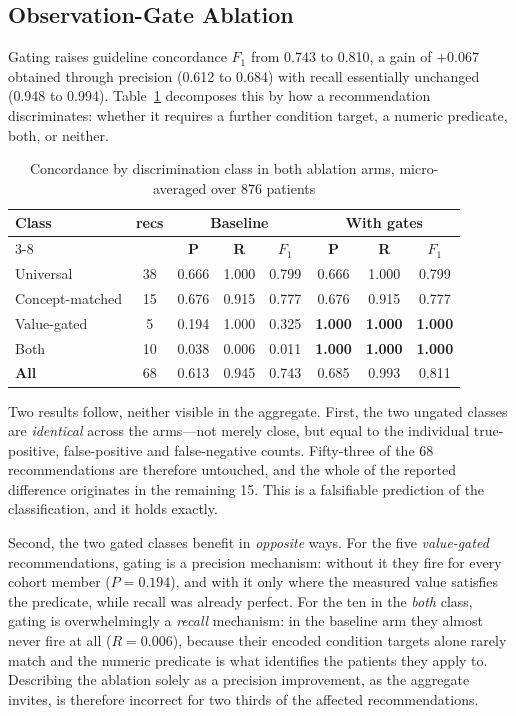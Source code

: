 \documentclass[conference]{IEEEtran}
\begin{document}
\subsection{Observation-Gate Ablation}
Gating raises guideline concordance $F_1$ from 0.743 to 0.810, a gain of $+0.067$ obtained
through precision (0.612 to 0.684) with recall essentially unchanged (0.948 to 0.994).
Table~\ref{tab:ablation} decomposes this by how a recommendation discriminates: whether it
requires a further condition target, a numeric predicate, both, or neither.

\begin{table}[htbp]
\caption{Concordance by discrimination class in both ablation arms, micro-averaged over
876 patients}
\label{tab:ablation}
\begin{center}
\setlength{\tabcolsep}{3.5pt}
\begin{tabular}{|l|c|c c c|c c c|}
\hline
\textbf{Class} & \textbf{recs} & \multicolumn{3}{c|}{\textbf{Baseline}}
                               & \multicolumn{3}{c|}{\textbf{With gates}} \\
\cline{3-8}
 & & \textbf{P} & \textbf{R} & \textbf{$F_1$}
   & \textbf{P} & \textbf{R} & \textbf{$F_1$} \\
\hline
Universal        & 38 & 0.666 & 1.000 & 0.799 & 0.666 & 1.000 & 0.799 \\
Concept-matched  & 15 & 0.676 & 0.915 & 0.777 & 0.676 & 0.915 & 0.777 \\
Value-gated      & 5  & 0.194 & 1.000 & 0.325 & \textbf{1.000} & \textbf{1.000} & \textbf{1.000} \\
Both             & 10 & 0.038 & 0.006 & 0.011 & \textbf{1.000} & \textbf{1.000} & \textbf{1.000} \\
\hline
\textbf{All}     & 68 & 0.613 & 0.945 & 0.743 & 0.685 & 0.993 & 0.811 \\
\hline
\end{tabular}
\end{center}
\end{table}

Two results follow, neither visible in the aggregate. First, the two ungated classes are
\emph{identical} across the arms---not merely close, but equal to the individual
true-positive, false-positive and false-negative counts. Fifty-three of the 68
recommendations are therefore untouched, and the whole of the reported difference
originates in the remaining 15. This is a falsifiable prediction of the classification, and
it holds exactly.

Second, the two gated classes benefit in \emph{opposite} ways. For the five
\emph{value-gated} recommendations, gating is a precision mechanism: without it they fire
for every cohort member ($P = 0.194$), and with it only where the measured value satisfies
the predicate, while recall was already perfect. For the ten in the \emph{both} class,
gating is overwhelmingly a \emph{recall} mechanism: in the baseline arm they almost never
fire at all ($R = 0.006$), because their encoded condition targets alone rarely match and
the numeric predicate is what identifies the patients they apply to. Describing the
ablation solely as a precision improvement, as the aggregate invites, is therefore
incorrect for two thirds of the affected recommendations.
\end{document}
